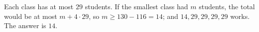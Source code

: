 Each class has at most $29$ students. If the smallest class had $m$ students, the total would be at most $m+4\cdot29$, so $m\ge130-116=14$; and $14,29,29,29,29$ works. The answer is $\boxed{14}$.
